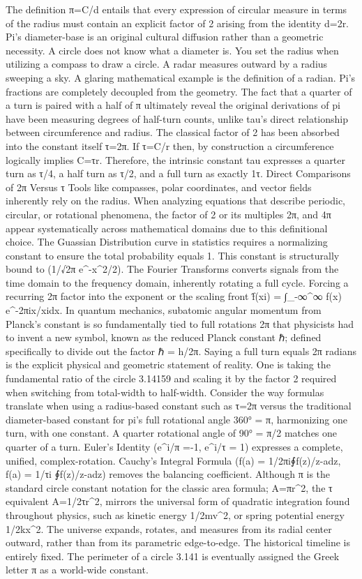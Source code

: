 {The definition π=C/d entails that every expression of circular measure in terms of the radius must contain an explicit factor of 2 arising from the identity d=2r. Pi’s diameter-base is an original cultural diffusion rather than a geometric necessity. A circle does not know what a diameter is. You set the radius when utilizing a compass to draw a circle. A radar measures outward by a radius sweeping a sky. A glaring mathematical example is the definition of a radian. Pi’s fractions are completely decoupled from the geometry. The fact that a quarter of a turn is paired with a half of π ultimately reveal the original derivations of pi have been measuring degrees of half-turn counts, unlike tau’s direct relationship between circumference and radius. The classical factor of 2 has been absorbed into the constant itself τ=2π. If τ=C/r then, by construction a circumference logically implies C=τr. Therefore, the intrinsic constant tau expresses a quarter turn as τ/4, a half turn as τ/2, and a full turn as exactly 1τ. 
Direct Comparisons of 2π Versus τ
Tools like compasses, polar coordinates, and vector fields inherently rely on the radius. When analyzing equations that describe periodic, circular, or rotational phenomena, the factor of 2 or its multiples 2π, and 4π appear systematically across mathematical domains due to this definitional choice. The Guassian Distribution curve in statistics requires a normalizing constant to ensure the total probability equals 1. This constant is structurally bound to ({1}/{√2π} {e^-x^2}/{2}). The Fourier Transforms converts signals from the time domain to the frequency domain, inherently rotating a full cycle. Forcing a recurring 2π factor into the exponent or the scaling front {f̂}(xi) = ∫_{-∞}^{∞} f(x) e^{-2πix/xi}dx. In quantum mechanics, subatomic angular momentum from Planck’s constant is so fundamentally tied to full rotations 2π that physicists had to invent a new symbol, known as the reduced Planck constant ℏ; defined specifically to divide out the factor ℏ  = {h}/{2π}.
Saying a full turn equals 2π radians is the explicit physical and geometric statement of reality. One is taking the fundamental ratio of the circle 3.14159 and scaling it by the factor 2 required when switching from total-width to half-width. Consider the way formulas translate when using a radius-based constant such as τ=2π versus the traditional diameter-based constant for pi’s full rotational angle 360° = π, harmonizing one turn, with one constant. A quarter rotational angle of 90° = {π}/{2} matches one quarter of a turn. Euler's Identity (e^{i/π} =-1, e^{i/τ} = 1) expresses a complete, unified, complex-rotation. Cauchy's Integral Formula ({f(a) = 1/2πi}∮{f(z)}/{z-a}dz, f(a) = 1/τi ∮f(z)}/{z-a}dz) removes the balancing coefficient. Although π is the standard circle constant notation for the classic area formula; A=πr^2, the τ equivalent A=1/2τr^2, mirrors the universal form of quadratic integration found throughout physics, such as kinetic energy 1/2mv^2, or spring potential energy 1/2kx^2. The universe expands, rotates, and measures from its radial center outward, rather than from its parametric edge-to-edge. The historical timeline is entirely fixed. The perimeter of a circle 3.141 is eventually assigned the Greek letter π as a world-wide constant.
